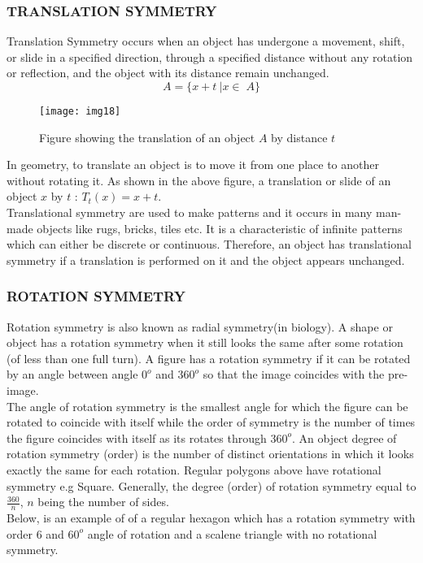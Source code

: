 \documentclass[a4paper, 12pt, openany]{report}
\begin{document}
	\subsubsection*{TRANSLATION SYMMETRY} 
	Translation Symmetry occurs when an object has undergone a movement, shift, or slide in a specified direction, through a specified distance without any rotation or reflection, and the object with its distance remain unchanged.
	$$A=\{x+t\:|x\in\;A\}$$
  \begin{figure}[H] \centering\texttt{[image: img18]}	\caption{Figure showing the translation of an object $A$ by distance $t$}
\end{figure}
In geometry, to translate an object is to move it from one place to another \linebreak without rotating it. As shown in the above figure, a translation or slide of an \linebreak object $x$ by $t$ : $T_t(x)=x+t$. \\
 Translational symmetry are used to make patterns and it occurs in many \linebreak man-made objects like rugs, bricks, tiles etc. It is a characteristic of infinite patterns which can either be discrete or continuous. Therefore, an object has translational symmetry if a translation is performed on it and the object appears unchanged.
 
 
	\subsubsection{ROTATION SYMMETRY}
	Rotation symmetry is also known as radial symmetry(in biology). A shape or object has a rotation symmetry when it still looks the same after some rotation (of less than one full turn). A figure has a rotation symmetry if it can be rotated by an angle between angle $0^o$ and $360^o$ so that the image coincides with the pre-image.\\ The angle of rotation symmetry is the smallest angle for which the figure can be rotated to coincide with itself while the order of symmetry is the number of times the figure coincides with itself as its rotates through $360^o$. An object degree of rotation symmetry (order) is the number of distinct \break orientations in which it looks exactly the same for each rotation. Regular polygons above have rotational symmetry e.g Square. Generally, the degree (order) of rotation symmetry equal to $\frac{360}{n}$, $n$ being the number of sides.\\
	Below, is an example of of a regular hexagon which has a rotation \break symmetry with order $6$ and $60^o$ angle of rotation and a scalene triangle with no rotational symmetry. 
	
\end{document}
